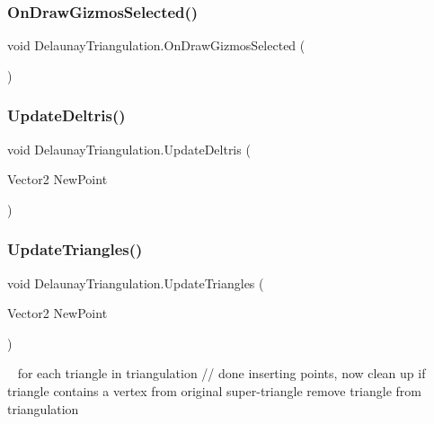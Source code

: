 \subsubsection{\texorpdfstring{On\+Draw\+Gizmos\+Selected()}{OnDrawGizmosSelected()}}
{\footnotesize\ttfamily void Delaunay\+Triangulation.\+On\+Draw\+Gizmos\+Selected (\begin{DoxyParamCaption}{ }\end{DoxyParamCaption})}

\mbox{\label{class_delaunay_triangulation_aa4b708614e1c66fde876d036630804da}} 
\subsubsection{\texorpdfstring{Update\+Deltris()}{UpdateDeltris()}}
{\footnotesize\ttfamily void Delaunay\+Triangulation.\+Update\+Deltris (\begin{DoxyParamCaption}\item[{Vector2}]{New\+Point }\end{DoxyParamCaption})\hspace{0.3cm}{\ttfamily [protected]}}

\mbox{\label{class_delaunay_triangulation_aa4ae5153592df4ba083d810a6d809999}} 
\subsubsection{\texorpdfstring{Update\+Triangles()}{UpdateTriangles()}}
{\footnotesize\ttfamily void Delaunay\+Triangulation.\+Update\+Triangles (\begin{DoxyParamCaption}\item[{Vector2}]{New\+Point }\end{DoxyParamCaption})\hspace{0.3cm}{\ttfamily [protected]}}

~\newline
 for each triangle in triangulation // done inserting points, now clean up if triangle contains a vertex from original super-\/triangle remove triangle from triangulation

